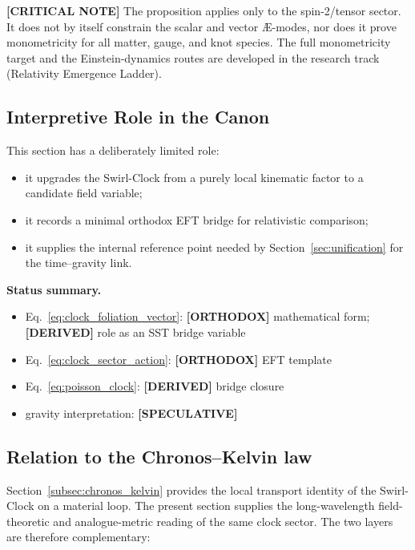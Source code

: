 \documentclass[11pt]{article}
\theoremstyle{definition}
\theoremstyle{plain}
\theoremstyle{remark}
\begin{document}
        \textbf{[CRITICAL NOTE]} The proposition applies only to the spin-2/tensor
        sector. It does not by itself constrain the scalar and vector \AE{}-modes,
        nor does it prove monometricity for all matter, gauge, and knot species. The
        full monometricity target and the Einstein-dynamics routes are developed in the
        research track (Relativity Emergence Ladder).

    \subsection{Interpretive Role in the Canon}

        This section has a deliberately limited role:
        \begin{itemize}
            \item it upgrades the Swirl-Clock from a purely local kinematic factor to a candidate field variable;
            \item it records a minimal orthodox EFT bridge for relativistic comparison;
            \item it supplies the internal reference point needed by Section~\ref{sec:unification} for the time--gravity link.
        \end{itemize}

        \textbf{Status summary.}
        \begin{itemize}
            \item Eq.~\eqref{eq:clock_foliation_vector}: \textbf{[ORTHODOX]} mathematical form; \textbf{[DERIVED]} role as an SST bridge variable
            \item Eq.~\eqref{eq:clock_sector_action}: \textbf{[ORTHODOX]} EFT template
            \item Eq.~\eqref{eq:poisson_clock}: \textbf{[DERIVED]} bridge closure
            \item gravity interpretation: \textbf{[SPECULATIVE]}
        \end{itemize}

    \subsection{Relation to the Chronos--Kelvin law}

        Section~\ref{subsec:chronos_kelvin} provides the local transport identity of the Swirl-Clock on a material loop. The present section supplies the long-wavelength field-theoretic and analogue-metric reading of the same clock sector. The two layers are therefore complementary:
\end{document}
